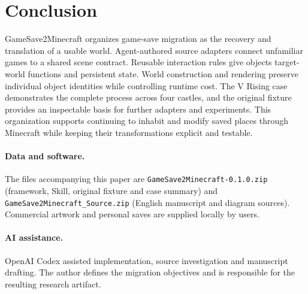 \documentclass[11pt]{article}
\begin{document}
\section{Conclusion}

GameSave2Minecraft organizes game-save migration as the recovery and translation
of a usable world. Agent-authored source adapters connect unfamiliar games to a
shared scene contract. Reusable interaction rules give objects target-world
functions and persistent state. World construction and rendering preserve
individual object identities while controlling runtime cost. The V Rising case
demonstrates the complete process across four castles, and the original fixture
provides an inspectable basis for further adapters and experiments. This
organization supports continuing to inhabit and modify saved places through
Minecraft while keeping their transformations explicit and testable.

\paragraph{Data and software.}
The files accompanying this paper are \texttt{GameSave2Minecraft-0.1.0.zip}
(framework, Skill, original fixture and case summary) and
\texttt{GameSave2Minecraft\_Source.zip} (English manuscript and diagram sources).
Commercial artwork and personal saves are supplied locally by users.

\paragraph{AI assistance.}
OpenAI Codex assisted implementation, source investigation and manuscript
drafting. The author defines the migration objectives and is responsible for
the resulting research artifact.



\end{document}

